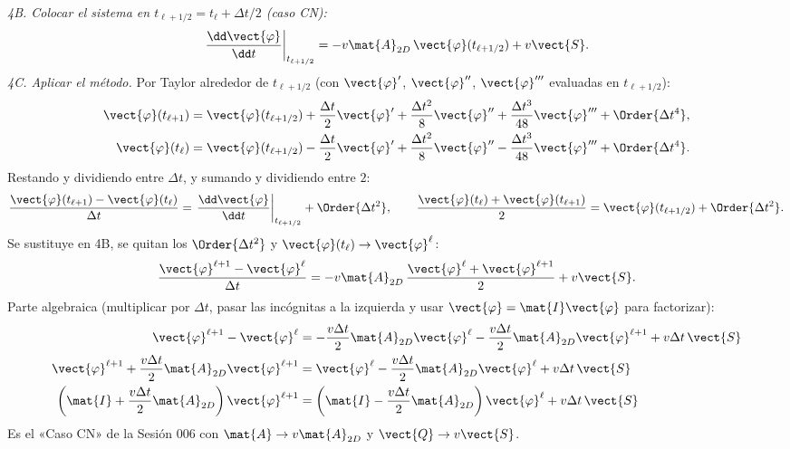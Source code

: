 \emph{4B. Colocar el sistema en $t_{\ell+1/2} = t_\ell + \Delta t/2$ (caso CN):}
\[
  \left.\frac{\dd\vect{\varphi}}{\dd t}\right|_{t_{\ell+1/2}}
  = -v\mat{A}_{2D}\,\vect{\varphi}(t_{\ell+1/2}) + v\vect{S}.
\]
\emph{4C. Aplicar el método.} Por Taylor alrededor de $t_{\ell+1/2}$ (con $\vect{\varphi}'$, $\vect{\varphi}''$,
$\vect{\varphi}'''$ evaluadas en $t_{\ell+1/2}$):
\begin{align*}
  \vect{\varphi}(t_{\ell+1}) &= \vect{\varphi}(t_{\ell+1/2}) + \frac{\Delta t}{2}\vect{\varphi}'
     + \frac{\Delta t^2}{8}\vect{\varphi}'' + \frac{\Delta t^3}{48}\vect{\varphi}''' + \Order{\Delta t^4},\\
  \vect{\varphi}(t_{\ell}) &= \vect{\varphi}(t_{\ell+1/2}) - \frac{\Delta t}{2}\vect{\varphi}'
     + \frac{\Delta t^2}{8}\vect{\varphi}'' - \frac{\Delta t^3}{48}\vect{\varphi}''' + \Order{\Delta t^4}.
\end{align*}
Restando y dividiendo entre $\Delta t$, y sumando y dividiendo entre $2$:
\[
  \frac{\vect{\varphi}(t_{\ell+1}) - \vect{\varphi}(t_\ell)}{\Delta t}
  = \left.\frac{\dd\vect{\varphi}}{\dd t}\right|_{t_{\ell+1/2}} + \Order{\Delta t^2},
  \qquad
  \frac{\vect{\varphi}(t_\ell) + \vect{\varphi}(t_{\ell+1})}{2} = \vect{\varphi}(t_{\ell+1/2}) + \Order{\Delta t^2}.
\]
Se sustituye en 4B, se quitan los $\Order{\Delta t^2}$ y $\vect{\varphi}(t_\ell)\to\vect{\varphi}^\ell$:
\[
  \frac{\vect{\varphi}^{\ell+1} - \vect{\varphi}^\ell}{\Delta t}
  = -v\mat{A}_{2D}\,\frac{\vect{\varphi}^\ell + \vect{\varphi}^{\ell+1}}{2} + v\vect{S}.
\]
Parte algebraica (multiplicar por $\Delta t$, pasar las incógnitas a la izquierda y usar
$\vect{\varphi} = \mat{I}\vect{\varphi}$ para factorizar):
\begin{align*}
  \vect{\varphi}^{\ell+1} - \vect{\varphi}^\ell
  &= -\frac{v\Delta t}{2}\mat{A}_{2D}\vect{\varphi}^\ell - \frac{v\Delta t}{2}\mat{A}_{2D}\vect{\varphi}^{\ell+1} + v\Delta t\,\vect{S}\\
  \vect{\varphi}^{\ell+1} + \frac{v\Delta t}{2}\mat{A}_{2D}\vect{\varphi}^{\ell+1}
  &= \vect{\varphi}^\ell - \frac{v\Delta t}{2}\mat{A}_{2D}\vect{\varphi}^\ell + v\Delta t\,\vect{S}\\
  \left(\mat{I} + \frac{v\Delta t}{2}\mat{A}_{2D}\right)\vect{\varphi}^{\ell+1}
  &= \left(\mat{I} - \frac{v\Delta t}{2}\mat{A}_{2D}\right)\vect{\varphi}^\ell + v\Delta t\,\vect{S}
\end{align*}
Es el «Caso CN» de la Sesión 006 con $\mat{A}\to v\mat{A}_{2D}$ y $\vect{Q}\to v\vect{S}$.

